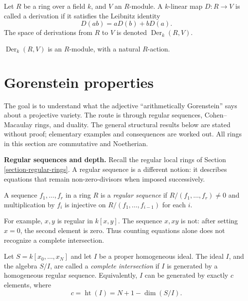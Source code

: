 \begin{definition}
\label{definition-derivation}
Let $R$ be a ring over a field $k$, and
$V$ an $R$-module. A $k$-linear map
$D:R\to V$ is called a derivation if it
satisfies the Leibnitz identity
$$
D(ab)=aD(b)+bD(a).
$$
The space of derivations from $R$ to $V$
is denoted $\operatorname{Der}_k(R,V)$.
\end{definition}

\begin{remark}
\label{remark-derivations-module}
$\operatorname{Der}_k(R,V)$ is an
$R$-module, with a natural $R$-action.
\end{remark}

\section{Gorenstein properties}
\label{section-gorenstein-properties}

The goal is to understand what the adjective
``arithmetically Gorenstein'' says about a
projective variety. The route is through
regular sequences, Cohen--Macaulay rings,
and duality. The general structural results
below are stated without proof; elementary
examples and consequences are worked out.
All rings in this section are commutative
and Noetherian.

\medskip\noindent
{\bf Regular sequences and depth.}
Recall the regular local rings of Section
\ref{section-regular-rings}.
A regular sequence is a different notion:
it describes equations that remain
non-zero-divisors when imposed successively.

\begin{definition}
\label{definition-regular-sequence}
A sequence $f_1,\ldots,f_r$ in a ring $R$
is a {\it regular sequence} if
$R/(f_1,\ldots,f_r)\ne0$ and multiplication
by $f_i$ is injective on
$R/(f_1,\ldots,f_{i-1})$ for each $i$.
\end{definition}

For example, $x,y$ is regular in $k[x,y]$.
The sequence $x,xy$ is not: after setting
$x=0$, the second element is zero.
Thus counting equations alone does not
recognize a complete intersection.

\begin{definition}
\label{definition-homogeneous-ci}
Let $S=k[x_0,\ldots,x_N]$ and let $I$ be
a proper homogeneous ideal.
The ideal $I$, and the algebra $S/I$, are
called a {\it complete intersection} if
$I$ is generated by a homogeneous regular
sequence. Equivalently, $I$ can be
generated by exactly $c$ elements, where
$$
c=\operatorname{ht}(I)=N+1-\dim(S/I).
$$
\end{definition}

